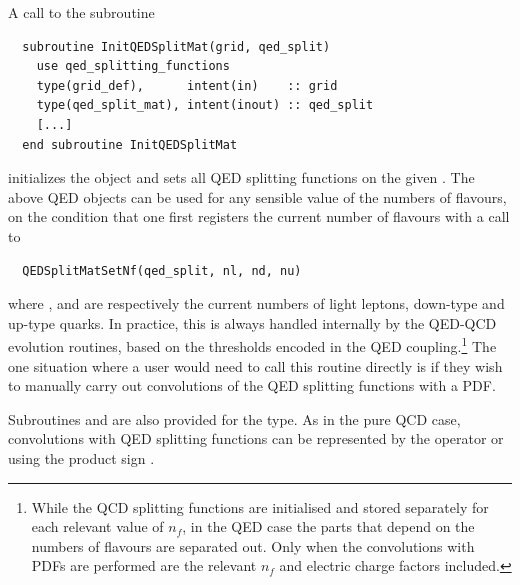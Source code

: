 A call to the subroutine 
\begin{lstlisting}     
  subroutine InitQEDSplitMat(grid, qed_split)
    use qed_splitting_functions
    type(grid_def),      intent(in)    :: grid
    type(qed_split_mat), intent(inout) :: qed_split
    [...]
  end subroutine InitQEDSplitMat
\end{lstlisting}     
initializes the  object  and sets all QED
splitting functions on the given .
%
The above QED objects can be used for any sensible value of the
numbers of flavours, on the condition that one first registers
the current number of flavours with a call to
\begin{lstlisting}
  QEDSplitMatSetNf(qed_split, nl, nd, nu)
\end{lstlisting}
where ,  and  are respectively the current
numbers of light leptons, down-type and up-type quarks.
%
In practice, this is always handled internally by the QED-QCD
evolution routines, based on the thresholds encoded in the QED
coupling.\footnote{While the QCD splitting functions are initialised
  and stored separately for each relevant value of $n_f$, in the QED
  case the parts that depend on the numbers of flavours are separated
  out.
  Only when the convolutions with PDFs are performed are the relevant
  $n_f$ and electric charge factors included.}
%
The one situation where a user would need to call this routine
directly is if they wish to manually carry out convolutions of the
QED splitting functions with a PDF.

Subroutines  and  are also provided for the
 type. As in the pure QCD case, convolutions with
QED splitting functions can be represented by the  operator or
using the product sign \ttt{*}.




